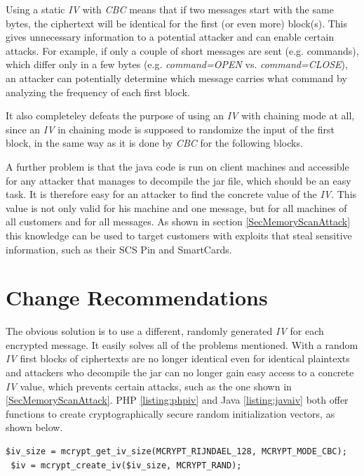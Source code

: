 Using a static \emph{IV} with \emph{CBC} means that if two messages start with the same bytes, the ciphertext will be identical for the first (or even more) block(s). This gives unnecessary information to a potential attacker and can enable certain attacks. For example, if only a couple of short messages are sent (e.g. commands), which differ only in a few bytes (e.g. \emph{command=OPEN} vs. \emph{command=CLOSE}), an attacker can potentially determine which message carries what command by analyzing the frequency of each first block. 

It also completeley defeats the purpose of using an \emph{IV} with chaining mode at all, since an \emph{IV} in chaining mode is supposed to randomize the input of the first block, in the same way as it is done by \emph{CBC} for the following blocks.

A further problem is that the java code is run on client machines and accessible for any attacker that manages to decompile the jar file, which should be an easy task. It is therefore easy for an attacker to find the concrete value of the \emph{IV}. This value is not only valid for his machine and one message, but for all machines of all customers and for all messages. As shown in section \ref{SecMemoryScanAttack} this knowledge can be used to target customers with exploits that steal sensitive information, such as their SCS Pin and SmartCards.

\section{Change Recommendations}
The obvious solution is to use a different, randomly generated \emph{IV} for each encrypted message. It easily solves all of the problems mentioned. With a random \emph{IV} first blocks of ciphertexts are no longer identical even for identical plaintexts and attackers who decompile the jar can no longer gain easy access to a concrete \emph{IV} value, which prevents certain attacks, such as the one shown in \ref{SecMemoryScanAttack}. PHP \ref{listing:phpiv} and Java \ref{listing:javaiv} both offer functions to create cryptographically secure random initialization vectors, as shown below.

\begin{lstlisting}[caption= PHP IV generation,label=listing:phpiv]
 $iv_size = mcrypt_get_iv_size(MCRYPT_RIJNDAEL_128, MCRYPT_MODE_CBC);
 $iv = mcrypt_create_iv($iv_size, MCRYPT_RAND);
\end{lstlisting}

